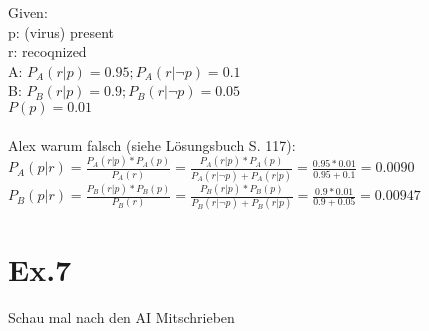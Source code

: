 \documentclass[11pt]{article}
\begin{document}
Given:\\
p: (virus) present\\
r: recoqnized\\
A: $P_A(r|p)=0.95; P_A(r|\neg p)=0.1$\\
B: $P_B(r|p)=0.9; P_B(r|\neg p)=0.05$\\
$P(p)=0.01$\\
\\
Alex warum falsch (siehe Lösungsbuch S. 117):\\
$P_A(p|r)=\frac{P_A(r|p)*P_A(p)}{P_A(r)}=\frac{P_A(r|p)*P_A(p)}{P_A(r|\neg p)+P_A(r|p)}=\frac{0.95*0.01}{0.95+0.1}=0.0090$\\
$P_B(p|r)=\frac{P_B(r|p)*P_B(p)}{P_B(r)}=\frac{P_B(r|p)*P_B(p)}{P_B(r|\neg p)+P_B(r|p)}=\frac{0.9*0.01}{0.9+0.05}=0.00947$\\

\section*{Ex.7}

Schau mal nach den AI Mitschrieben
\end{document}
